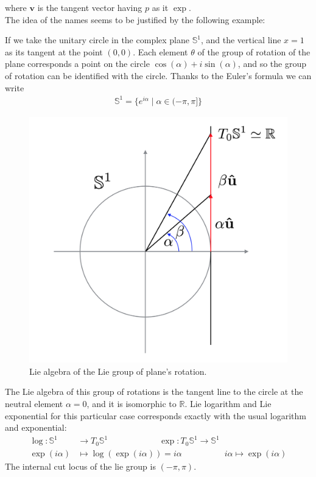 where $\mathbf{v}  $ is the tangent vector having $p$ as it $\exp$.\\
The idea of the names seems to be justified by the following example:
\begin{example}
	If we take the unitary circle in the complex plane $\mathbb{S}^{1}$, and the vertical line $x = 1$ as its tangent at the point $(0,0)$. Each element $\theta$ of the group of rotation of the plane corresponds a point on the circle $\cos(\alpha)+ i\sin(\alpha)$, and so the group of rotation can be identified with the circle. Thanks to the Euler's formula we can write
	\begin{align*}
	\mathbb{S}^{1} = \{e^{i\alpha}  \mid \alpha \in (-\pi,\pi] \}
	\end{align*}
	\begin{figure}[!ht]
		\centering
		\includegraphics[scale=0.35]{figures/circle_example.png}
		\caption{Lie algebra of the Lie group of plane's rotation.}
		\label{fig:evolution}
	\end{figure}  
	The Lie algebra of this group of rotations is the tangent line to the circle at the neutral element $\alpha = 0$, and it is isomorphic to $\mathbb{R}$. Lie logarithm and Lie exponential for this particular case corresponds exactly with the usual logarithm and exponential:
	\begin{align*}
	\log : \mathbb{S}^{1} & \longrightarrow T_{0} \mathbb{S}^{1} 
	\qquad \qquad \quad \quad 
	\exp : T_{0} \mathbb{S}^{1}  \longrightarrow \mathbb{S}^{1}
	\\
	\exp{(i\alpha)} &\longmapsto \log(\exp{(i\alpha)})  =  i\alpha 
	\qquad \qquad \quad   
	i\alpha \longmapsto \exp(i\alpha)  
	\end{align*}
	The internal cut locus of the lie group is $(-\pi, \pi)$.
\end{example}

